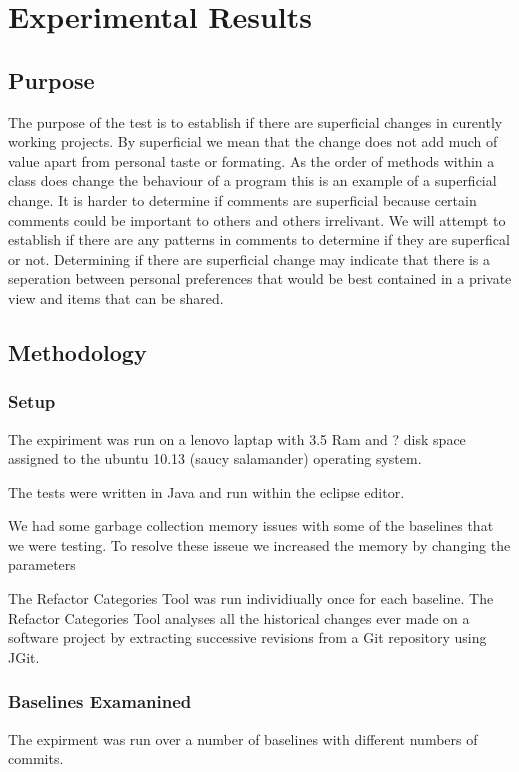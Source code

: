 
\chapter{Experimental Results}

\section{Purpose}
The purpose of the test is to establish if there are superficial changes in curently working projects.  By superficial we mean that the change does not add   much of value apart from personal taste or formating.  As the order of methods within a class does change the behaviour of a program this is an example of a superficial change.  It is harder to determine if comments are superficial because certain comments could be important to others and others irrelivant. We will attempt to establish if there are any patterns in comments to determine if they are superfical or not.  Determining if there are superficial change may indicate that there is a seperation between personal preferences that would be best contained in a private view and items that can be shared.    


\section{Methodology}


\subsection{Setup}
The expiriment was run on a lenovo laptap with 3.5 Ram and ? disk space assigned to the ubuntu 10.13 (saucy salamander) operating system.  

The tests were written in Java and run within the eclipse editor.

We had some garbage collection memory issues with some of the baselines that we were testing. To resolve these isseue we increased the memory by changing the parameters

The Refactor Categories Tool was run individiually once for each baseline.  The Refactor Categories Tool analyses all the historical changes ever made on a software project by extracting successive revisions from a Git repository using JGit.

\subsection{Baselines Examanined}
 The expirment was run over a number of baselines with different numbers of commits.
 
